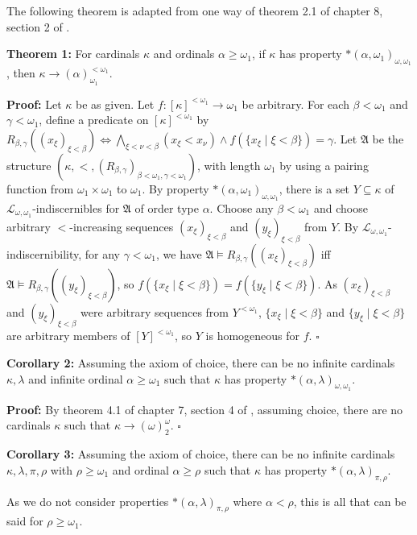 \documentclass{article}
\begin{document}
The following theorem is adapted from one way of theorem 2.1 of chapter 8, section 2 of \cite{Drake74}.

\textbf{Theorem 1:} For cardinals $\kappa$ and ordinals $\alpha\geq\omega_1$, if $\kappa$ has property $\ast(\alpha,\omega_1)_{\omega,\omega_1}$, then $\kappa\rightarrow(\alpha)^{<\omega_1}_{\omega_1}$.

\textbf{Proof:} Let $\kappa$ be as given. Let $f:[\kappa]^{<\omega_1}\to\omega_1$ be arbitrary. For each $\beta<\omega_1$ and $\gamma<\omega_1$, define a predicate on $[\kappa]^{<\omega_1}$ by $R_{\beta,\gamma}((x_\xi)_{\xi<\beta}) \iff \bigwedge_{\xi<\nu<\beta}(x_\xi<x_\nu) \land f(\{x_\xi\mid\xi<\beta\}) = \gamma$. Let $\mathfrak A$ be the structure $(\kappa,<,(R_{\beta,\gamma})_{\beta<\omega_1,\gamma<\omega_1})$, with length $\omega_1$ by using a pairing function from $\omega_1\times\omega_1$ to $\omega_1$. By property $\ast(\alpha,\omega_1)_{\omega,\omega_1}$, there is a set $Y\subseteq\kappa$ of $\mathcal L_{\omega,\omega_1}$-indiscernibles for $\mathfrak A$ of order type $\alpha$. Choose any $\beta<\omega_1$ and choose arbitrary $<$-increasing sequences $(x_\xi)_{\xi<\beta}$ and $(y_\xi)_{\xi<\beta}$ from $Y$. By $\mathcal L_{\omega,\omega_1}$-indiscernibility, for any $\gamma<\omega_1$, we have $\mathfrak A\vDash R_{\beta,\gamma}((x_\xi)_{\xi<\beta})$ iff $\mathfrak A\vDash R_{\beta,\gamma}((y_\xi)_{\xi<\beta})$, so $f(\{x_\xi\mid\xi<\beta\}) = f(\{y_\xi\mid\xi<\beta\})$. As $(x_\xi)_{\xi<\beta}$ and $(y_\xi)_{\xi<\beta}$ were arbitrary sequences from $Y^{<\omega_1}$, $\{x_\xi\mid\xi<\beta\}$ and $\{y_\xi\mid\xi<\beta\}$ are arbitrary members of $[Y]^{<\omega_1}$, so $Y$ is homogeneous for $f$. $\square$

\textbf{Corollary 2:} Assuming the axiom of choice, there can be no infinite cardinals $\kappa,\lambda$ and infinite ordinal $\alpha\geq\omega_1$ such that $\kappa$ has property $\ast(\alpha,\lambda)_{\omega,\omega_1}$.

\textbf{Proof:} By theorem 4.1 of chapter 7, section 4 of \cite{Drake74}, assuming choice, there are no cardinals $\kappa$ such that $\kappa\rightarrow(\omega)^\omega_2$. $\square$

\textbf{Corollary 3:} Assuming the axiom of choice, there can be no infinite cardinals $\kappa,\lambda,\pi,\rho$ with $\rho\geq\omega_1$ and ordinal $\alpha\geq\rho$ such that $\kappa$ has property $\ast(\alpha,\lambda)_{\pi,\rho}$.

As we do not consider properties $\ast(\alpha,\lambda)_{\pi,\rho}$ where $\alpha<\rho$, this is all that can be said for $\rho\geq\omega_1$.
\end{document}
